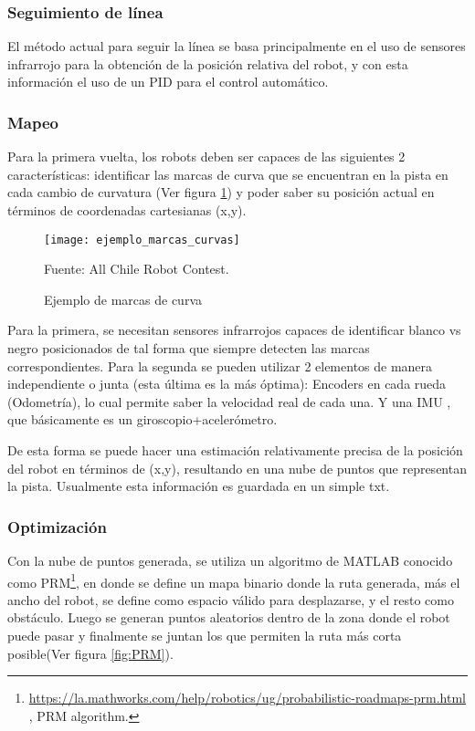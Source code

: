 \subsubsection{Seguimiento de línea}
El método actual para seguir la línea se basa principalmente en el uso de sensores infrarrojo para la obtención de la posición relativa del robot, y con esta información el uso de un PID para el control automático.

\subsubsection{Mapeo}
Para la primera vuelta, los robots deben ser capaces de las siguientes 2 características: identificar las marcas de curva que se encuentran en la pista en cada cambio de curvatura (Ver figura \ref{fig:marcaspista}) y poder saber su posición actual en términos de coordenadas cartesianas (x,y).

\begin{figure}[h]
\centering
\texttt{[image: ejemplo\_marcas\_curvas]}
\caption{\label{fig:marcaspista} Ejemplo de marcas de curva} Fuente: All Chile Robot Contest.
\end{figure}

Para la primera, se necesitan sensores infrarrojos capaces de identificar blanco vs negro posicionados de tal forma que siempre detecten las marcas correspondientes. Para la segunda se pueden utilizar 2 elementos de manera independiente o junta (esta última es la más óptima): Encoders en cada rueda (Odometría), lo cual permite saber la velocidad real de cada una. Y una IMU , que básicamente es un giroscopio+acelerómetro.

De esta forma se puede hacer una estimación relativamente precisa de la posición del robot en términos de (x,y), resultando en una nube de puntos que representan la pista. Usualmente esta información es guardada en un simple txt.

\subsubsection{Optimización}
Con la nube de puntos generada, se utiliza un algoritmo de MATLAB conocido como PRM\footnote{\url{https://la.mathworks.com/help/robotics/ug/probabilistic-roadmaps-prm.html} , PRM algorithm.}, en donde se define 
un mapa binario donde la ruta generada, más el ancho del robot, se define como espacio válido para desplazarse, y el resto como obstáculo. Luego se generan puntos aleatorios dentro de la zona donde el robot puede pasar y finalmente se juntan los que permiten la ruta más corta posible(Ver figura \ref{fig:PRM}).

